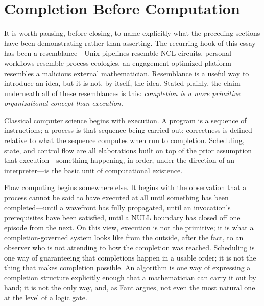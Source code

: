 \documentclass[12pt, a4paper]{article}
\begin{document}
\section{Completion Before Computation}

It is worth pausing, before closing, to name explicitly what the
preceding sections have been demonstrating rather than asserting.
The recurring hook of this essay has been a resemblance---Unix
pipelines resemble NCL circuits, personal workflows resemble
process ecologies, an engagement-optimized platform resembles a
malicious external mathematician. Resemblance is a useful way to
introduce an idea, but it is not, by itself, the idea. Stated
plainly, the claim underneath all of these resemblances is this:
\emph{completion is a more primitive organizational concept than
execution.}

Classical computer science begins with execution. A program is a
sequence of instructions; a process is that sequence being carried
out; correctness is defined relative to what the sequence
computes when run to completion. Scheduling, state, and control
flow are all elaborations built on top of the prior assumption
that execution---something happening, in order, under the
direction of an interpreter---is the basic unit of computational
existence.

Flow computing begins somewhere else. It begins with the
observation that a process cannot be said to have executed at all
until something has been completed---until a wavefront has fully
propagated, until an invocation's prerequisites have been
satisfied, until a NULL boundary has closed off one episode from
the next. On this view, execution is not the primitive; it is
what a completion-governed system looks like from the outside,
after the fact, to an observer who is not attending to how the
completion was reached. Scheduling is one way of guaranteeing that
completions happen in a usable order; it is not the thing that
makes completion possible. An algorithm is one way of expressing a
completion structure explicitly enough that a mathematician can
carry it out by hand; it is not the only way, and, as Fant argues,
not even the most natural one at the level of a logic gate.
\end{document}
